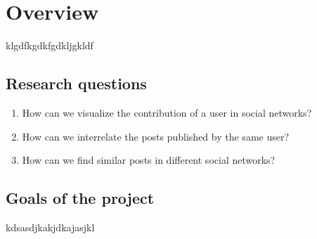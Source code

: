 \section{Overview}
klgdfkgdkfgdkljgkldf

\subsection{Research questions}

\begin{enumerate}
\item How can we visualize the contribution of a user in social networks?
\item How can we interrelate the posts published by the same user?
\item How can we find similar posts in different social networks?
\end{enumerate}


\subsection{Goals of the project}

kdsasdjkakjdkajasjkl

